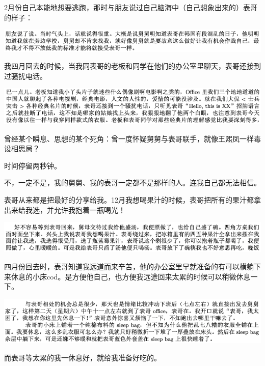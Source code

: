 \documentclass[9pt, b5paper]{article}
\begin{document}
2月份自己本能地想要逃跑，那时与朋友说过自己脑海中（自己想象出来的）表哥的样子：

\begin{center}
\includegraphics[width=.9\linewidth]{./pic/p1p49-1.png}
\end{center}

我四月回去的时候，当我同表哥的老板和同学在他们的办公室里聊天，表哥还接到过骚扰电话。

\begin{center}
\includegraphics[width=.9\linewidth]{./pic/p1p57-1.png}
\end{center}

曾经某个瞬息、思想的某个死角：曾一度怀疑舅舅与表哥联手，就像王熙凤一样毒设相思局？

时间停留两秒钟。

不，一定不是，我的舅舅、我的表哥一定都不是那样的人。连我自己都无法相信。 

表哥从来都是把最好的分享给我。12月我想喝果汁的时候，表哥把所有的果汁都拿出来给我选，并允许我抱着一瓶喝光！

\begin{center}
\includegraphics[width=.9\linewidth]{./pic/p1p42-2.png}
\end{center}

四月份回去时，表哥知道我远道而来辛苦，他的办公室里早就准备的有可以横躺下来休息的小床cod。是方便他自己，也方便我远途回来太累的时候可以稍微休息一下。 

\begin{center}
\includegraphics[width=.9\linewidth]{./pic/p1p52-4.png}
\end{center}

而表哥等太累的我一休息好，就给我准备好吃的。
\end{document}
